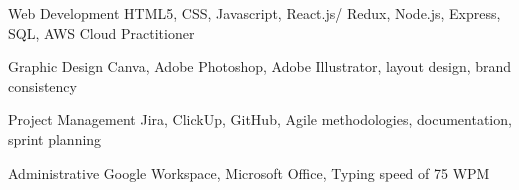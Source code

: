 

\begin{cvskills}

  \cvskill
    {Web Development} %
    {HTML5, CSS, Javascript, React.js/ Redux, Node.js, Express, SQL, AWS Cloud Practitioner} %

  \cvskill
    {Graphic Design} %
    {Canva, Adobe Photoshop, Adobe Illustrator, layout design, brand consistency} %

  \cvskill
    {Project Management} %
    {Jira, ClickUp, GitHub, Agile methodologies, documentation, sprint planning} %

  \cvskill
    {Administrative} %
    {Google Workspace, Microsoft Office, Typing speed of 75 WPM} %


\end{cvskills}
